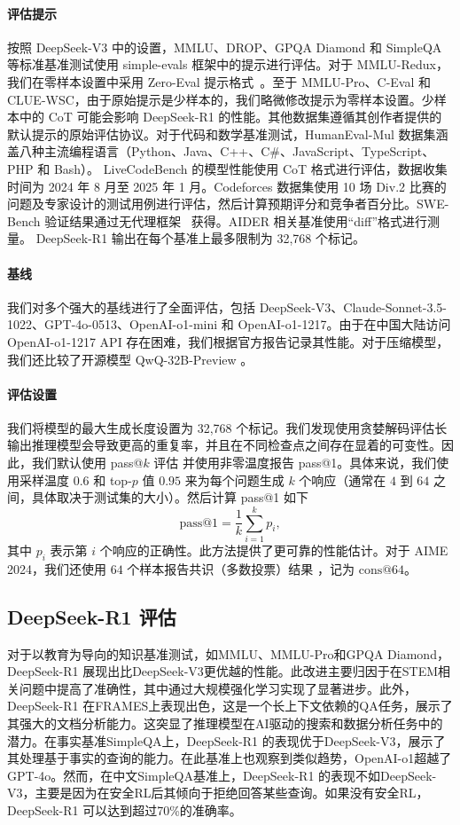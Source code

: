 \documentclass[11pt, a4paper, logo, copyright, nonumbering]{deepseek}
\newcommand{\dsri}{DeepSeek-R1}
\begin{document}
\paragraph{评估提示} 按照 DeepSeek-V3 中的设置，MMLU、DROP、GPQA Diamond 和 SimpleQA 等标准基准测试使用 simple-evals 框架中的提示进行评估。对于 MMLU-Redux，我们在零样本设置中采用 Zero-Eval 提示格式~\citep{Lin_ZeroEval_A_Unified_2024}。至于 MMLU-Pro、C-Eval 和 CLUE-WSC，由于原始提示是少样本的，我们略微修改提示为零样本设置。少样本中的 CoT 可能会影响 \dsri{} 的性能。其他数据集遵循其创作者提供的默认提示的原始评估协议。对于代码和数学基准测试，HumanEval-Mul 数据集涵盖八种主流编程语言（Python、Java、C++、C\#、JavaScript、TypeScript、PHP 和 Bash）。 LiveCodeBench 的模型性能使用 CoT 格式进行评估，数据收集时间为 2024 年 8 月至 2025 年 1 月。Codeforces 数据集使用 10 场 Div.2 比赛的问题及专家设计的测试用例进行评估，然后计算预期评分和竞争者百分比。SWE-Bench 验证结果通过无代理框架~\citep{agentless} 获得。AIDER 相关基准使用“diff”格式进行测量。 \dsri{} 输出在每个基准上最多限制为 32,768 个标记。

\paragraph{基线} 我们对多个强大的基线进行了全面评估，包括 DeepSeek-V3、Claude-Sonnet-3.5-1022、GPT-4o-0513、OpenAI-o1-mini 和 OpenAI-o1-1217。由于在中国大陆访问 OpenAI-o1-1217 API 存在困难，我们根据官方报告记录其性能。对于压缩模型，我们还比较了开源模型 QwQ-32B-Preview \citep{QwQ}。

\paragraph{评估设置} 我们将模型的最大生成长度设置为 32,768 个标记。我们发现使用贪婪解码评估长输出推理模型会导致更高的重复率，并且在不同检查点之间存在显着的可变性。因此，我们默认使用 pass@$k$ 评估 \citep{codex} 并使用非零温度报告 pass@1。具体来说，我们使用采样温度 $0.6$ 和 top-$p$ 值 $0.95$ 来为每个问题生成 $k$ 个响应（通常在 $4$ 到 $64$ 之间，具体取决于测试集的大小）。然后计算 pass@1 如下
\[
\text{pass@1} = \frac{1}{k} \sum_{i=1}^{k} p_i,
\]
其中 $p_i$ 表示第 $i$ 个响应的正确性。此方法提供了更可靠的性能估计。对于 AIME 2024，我们还使用 $64$ 个样本报告共识（多数投票）结果 \citep{wang2022self}，记为 $\text{cons}@64$。
\subsection{\dsri{} 评估}


对于以教育为导向的知识基准测试，如MMLU、MMLU-Pro和GPQA Diamond，\dsri{} 展现出比DeepSeek-V3更优越的性能。此改进主要归因于在STEM相关问题中提高了准确性，其中通过大规模强化学习实现了显著进步。此外，\dsri{} 在FRAMES上表现出色，这是一个长上下文依赖的QA任务，展示了其强大的文档分析能力。这突显了推理模型在AI驱动的搜索和数据分析任务中的潜力。在事实基准SimpleQA上，\dsri{} 的表现优于DeepSeek-V3，展示了其处理基于事实的查询的能力。在此基准上也观察到类似趋势，OpenAI-o1超越了GPT-4o。然而，在中文SimpleQA基准上，\dsri{} 的表现不如DeepSeek-V3，主要是因为在安全RL后其倾向于拒绝回答某些查询。如果没有安全RL，\dsri{} 可以达到超过70\%的准确率。
\end{document}
